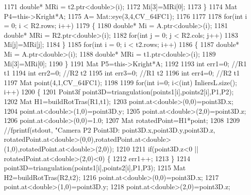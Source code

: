 \begin{DoxyCode}
1171         \textcolor{keywordtype}{double}* MRi = t2.ptr<\textcolor{keywordtype}{double}>(i);
1172         Mi[3]=MRi[0];
1173     \}
1174     Mat P4=this->Kright*A;
1175     A= Mat::eye(3,4,CV\_64FC1);
1176 
1177 
1178     \textcolor{keywordflow}{for}(\textcolor{keywordtype}{int} i = 0; i < R2.rows; i++)
1179     \{
1180         \textcolor{keywordtype}{double}* Mi = A.ptr<\textcolor{keywordtype}{double}>(i);
1181         \textcolor{keywordtype}{double}* MRi = R2.ptr<\textcolor{keywordtype}{double}>(i);
1182         \textcolor{keywordflow}{for}(\textcolor{keywordtype}{int} j = 0; j < R2.cols; j++)
1183             Mi[j]=MRi[j];
1184     \}
1185     \textcolor{keywordflow}{for}(\textcolor{keywordtype}{int} i = 0; i < t2.rows; i++)
1186     \{
1187         \textcolor{keywordtype}{double}* Mi = A.ptr<\textcolor{keywordtype}{double}>(i);
1188         \textcolor{keywordtype}{double}* MRi = t1.ptr<\textcolor{keywordtype}{double}>(i);
1189         Mi[3]=MRi[0];
1190     \}
1191     Mat P5=this->Kright*A;
1192 
1193     \textcolor{keywordtype}{int} err1=0; \textcolor{comment}{//R1 t1}
1194     \textcolor{keywordtype}{int} err2=0; \textcolor{comment}{//R2 t2}
1195     \textcolor{keywordtype}{int} err3=0; \textcolor{comment}{//R1 t2}
1196     \textcolor{keywordtype}{int} err4=0; \textcolor{comment}{//R2 t1}
1197     Mat point(4,1,CV\_64FC1);
1198 
1199     \textcolor{keywordflow}{for}(\textcolor{keywordtype}{int} i=0; i<(int) InliersL.size(); i++)
1200     \{
1201         Point3f point3D=triangulation(points1[i],points2[i],P1,P2);
1202         Mat H1=buildRotTras(R1,t1);
1203         point.at<\textcolor{keywordtype}{double}>(0,0)=point3D.x;
1204         point.at<\textcolor{keywordtype}{double}>(1,0)=point3D.y;
1205         point.at<\textcolor{keywordtype}{double}>(2,0)=point3D.z;
1206         point.at<\textcolor{keywordtype}{double}>(0,0)=1.0;
1207         Mat rotatedPoint=H1*point;
1208 
1209         \textcolor{comment}{//fprintf(stdout, "Camera P2 Point3D: %
       point3D.x,point3D.y,point3D.z, rotatedPoint.at<double>(0,0),rotatedPoint.at<double>(1,0),rotatedPoint.at<double>(2,0));}
1210 
1211         \textcolor{keywordflow}{if}(point3D.z<0 || rotatedPoint.at<\textcolor{keywordtype}{double}>(2,0)<0) \{
1212             err1++;
1213         \}
1214         point3D=triangulation(points1[i],points2[i],P1,P3);
1215         Mat H2=buildRotTras(R2,t2);
1216         point.at<\textcolor{keywordtype}{double}>(0,0)=point3D.x;
1217         point.at<\textcolor{keywordtype}{double}>(1,0)=point3D.y;
1218         point.at<\textcolor{keywordtype}{double}>(2,0)=point3D.z;

\end{DoxyCode}
